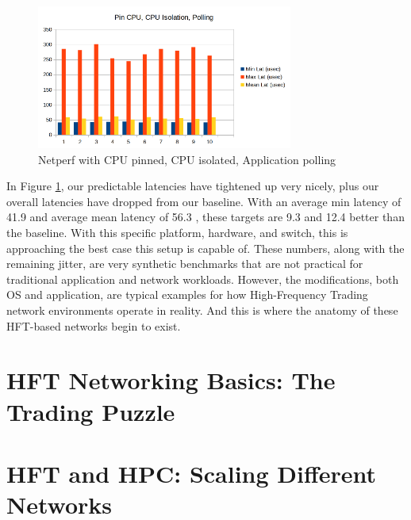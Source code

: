 \documentclass[letterpaper]{article}
\begin{document}
{{\begin{figure}[h]
\includegraphics[width=3.31in]{netperf-cpu-pin-cpu-isol-polling.png}
\caption{Netperf with CPU pinned, CPU isolated, Application polling}
\label{netperf-cpu-pin-cpu-isol-polling}
\end{figure}

In Figure \ref{netperf-cpu-pin-cpu-isol-polling}, our predictable latencies have tightened up very nicely, plus our overall latencies have dropped from our baseline.  With an average min latency of 41.9  and average mean latency of 56.3 , these targets are 9.3  and 12.4  better than the baseline. With this specific platform, hardware, and switch, this is approaching the best case this setup is capable of.
\newline
\newline
These numbers, along with the remaining jitter, are very synthetic benchmarks that are not practical for traditional application and network workloads.  However, the modifications, both OS and application, are typical examples for how High-Frequency Trading network environments operate in reality.  And this is where the anatomy of these HFT-based networks begin to exist.

\section{HFT Networking Basics: The Trading Puzzle}

\section{HFT and HPC: Scaling Different Networks}

}}
\end{document}
